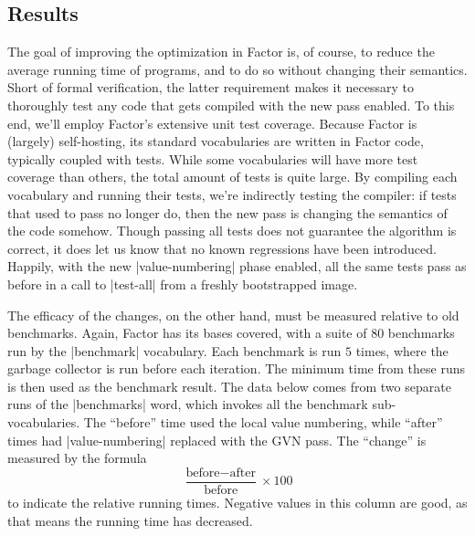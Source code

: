 \subsection{Results}\label{sec:vn:results}

The goal of improving the optimization in Factor is, of course, to reduce the
average running time of programs, and to do so without changing their
semantics.  Short of formal verification, the latter requirement makes it
necessary to thoroughly test any code that gets compiled with the new pass
enabled.  To this end, we'll employ Factor's extensive unit test coverage.
Because Factor is (largely) self-hosting, its standard vocabularies are written
in Factor code, typically coupled with tests.  While some vocabularies will
have more test coverage than others, the total amount of tests is quite large.
By compiling each vocabulary and running their tests, we're indirectly testing
the compiler: if tests that used to pass no longer do, then the new pass is
changing the semantics of the code somehow.  Though passing all tests does not
guarantee the algorithm is correct, it does let us know that no known
regressions have been introduced.  Happily, with the new
\factor|value-numbering| phase enabled, all the same tests pass as before in a
call to \factor|test-all| from a freshly bootstrapped image.

The efficacy of the changes, on the other hand, must be measured relative to
old benchmarks.  Again, Factor has its bases covered, with a suite of $80$
benchmarks run by the \factor|benchmark| vocabulary.  Each benchmark is run $5$
times, where the garbage collector is run before each iteration.  The minimum
time from these runs is then used as the benchmark result.  The data below
comes from two separate runs of the \factor|benchmarks| word, which invokes all
the benchmark sub-vocabularies.  The ``before'' time used the local value
numbering, while ``after'' times had \factor|value-numbering| replaced with the
\gls{GVN} pass.  The ``change'' is measured by the formula
%
$$\frac{\text{before} - \text{after}}{\text{before}} \times 100$$
%
to indicate the relative running times.  Negative values in this column are
good, as that means the running time has decreased.


